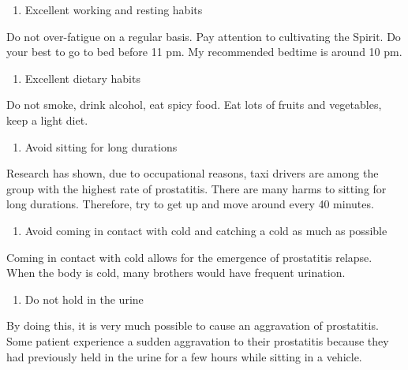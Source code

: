 \documentclass[
]{book}
\providecommand{\tightlist}{%
  \setlength{\itemsep}{0pt}\setlength{\parskip}{0pt}}
\begin{document}
\begin{enumerate}
\def\labelenumi{\arabic{enumi}.}
\setcounter{enumi}{1}
\tightlist
\item
  Excellent working and resting habits
\end{enumerate}

Do not over-fatigue on a regular basis. Pay attention to cultivating the Spirit. Do your best to go to bed before 11 pm. My recommended bedtime is around 10 pm.

\begin{enumerate}
\def\labelenumi{\arabic{enumi}.}
\setcounter{enumi}{2}
\tightlist
\item
  Excellent dietary habits
\end{enumerate}

Do not smoke, drink alcohol, eat spicy food. Eat lots of fruits and vegetables, keep a light diet.

\begin{enumerate}
\def\labelenumi{\arabic{enumi}.}
\setcounter{enumi}{3}
\tightlist
\item
  Avoid sitting for long durations
\end{enumerate}

Research has shown, due to occupational reasons, taxi drivers are among the group with the highest rate of prostatitis. There are many harms to sitting for long durations. Therefore, try to get up and move around every 40 minutes.

\begin{enumerate}
\def\labelenumi{\arabic{enumi}.}
\setcounter{enumi}{4}
\tightlist
\item
  Avoid coming in contact with cold and catching a cold as much as possible
\end{enumerate}

Coming in contact with cold allows for the emergence of prostatitis relapse. When the body is cold, many brothers would have frequent urination.

\begin{enumerate}
\def\labelenumi{\arabic{enumi}.}
\setcounter{enumi}{5}
\tightlist
\item
  Do not hold in the urine
\end{enumerate}

By doing this, it is very much possible to cause an aggravation of prostatitis. Some patient experience a sudden aggravation to their prostatitis because they had previously held in the urine for a few hours while sitting in a vehicle.
\end{document}

